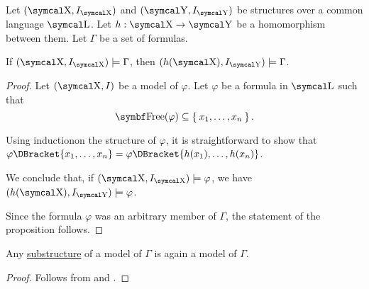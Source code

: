 \begin{proposition}\label{thm:first_order_homomorphism_preserves_models}
  Let \( (\CX, I_{\CX}) \) and \( (\CY, I_{\CY}) \) be structures over a common language \( \CL \). Let \( h: \CX \to \CY \) be a homomorphism between them. Let \( \Gamma \) be a set of formulas.

  If \( (\CX, I_{\CX}) \models \Gamma \), then \( (h(\CX), I_{\CY}) \models \Gamma \).
\end{proposition}
\begin{proof}
  Let \( (\CX, I) \) be a model of \( \varphi \). Let \( \varphi \) be a formula in \( \CL \) such that
  \begin{equation*}
    \Bold{Free}(\varphi) \subseteq \Set{x_1, \ldots, x_n}.
  \end{equation*}

  Using induction\IND on the structure of \( \varphi \), it is straightforward to show that \( \varphi\DBracket{x_1, \ldots, x_n} = \varphi\DBracket{h(x_1), \ldots, h(x_n)} \).

  We conclude that, if \( (\CX, I_{\CX}) \models \varphi \), we have \( (h(\CX), I_{\CY}) \models \varphi \).

  Since the formula \( \varphi \) was an arbitrary member of \( \Gamma \), the statement of the proposition follows.
\end{proof}

\begin{corollary}\label{thm:substructure_is_model}
  Any \hyperref[def:first_order_substructure]{substructure} of a model of \( \Gamma \) is again a model of \( \Gamma \).
\end{corollary}
\begin{proof}
  Follows from  and .
\end{proof}
